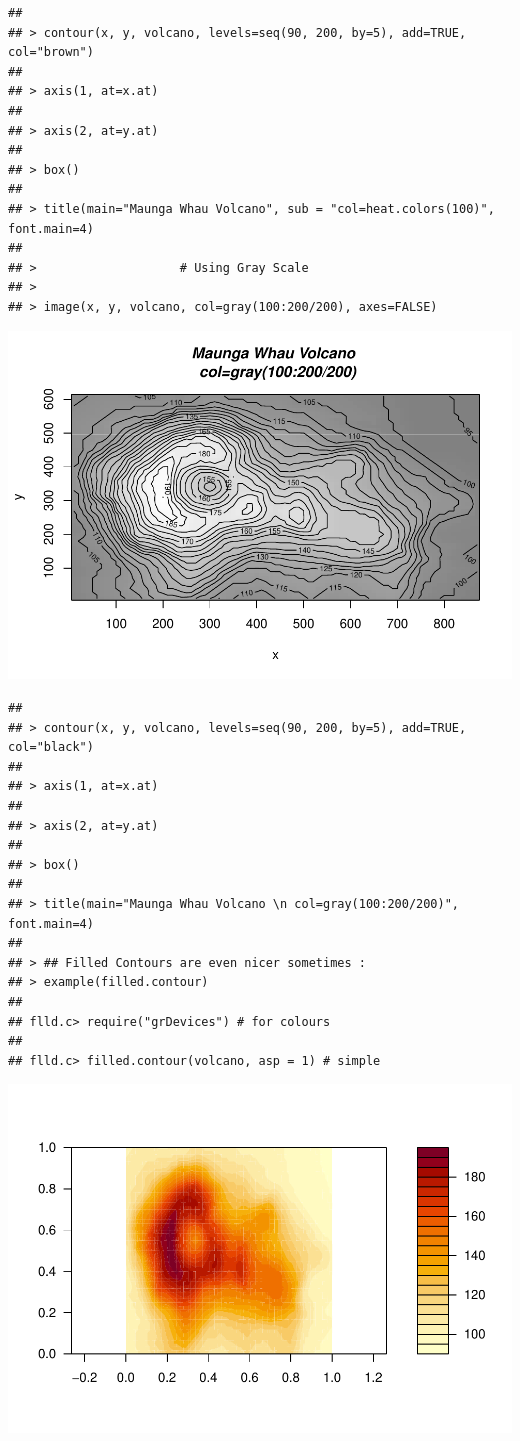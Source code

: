 \documentclass[
]{book}
\begin{document}
\begin{verbatim}
## 
## > contour(x, y, volcano, levels=seq(90, 200, by=5), add=TRUE, col="brown")
## 
## > axis(1, at=x.at)
## 
## > axis(2, at=y.at)
## 
## > box()
## 
## > title(main="Maunga Whau Volcano", sub = "col=heat.colors(100)", font.main=4)
## 
## >                    # Using Gray Scale
## > 
## > image(x, y, volcano, col=gray(100:200/200), axes=FALSE)
\end{verbatim}

\includegraphics{TudodoR_files/figure-latex/unnamed-chunk-145-3.pdf}

\begin{verbatim}
## 
## > contour(x, y, volcano, levels=seq(90, 200, by=5), add=TRUE, col="black")
## 
## > axis(1, at=x.at)
## 
## > axis(2, at=y.at)
## 
## > box()
## 
## > title(main="Maunga Whau Volcano \n col=gray(100:200/200)", font.main=4)
## 
## > ## Filled Contours are even nicer sometimes :
## > example(filled.contour)
## 
## flld.c> require("grDevices") # for colours
## 
## flld.c> filled.contour(volcano, asp = 1) # simple
\end{verbatim}

\includegraphics{TudodoR_files/figure-latex/unnamed-chunk-145-4.pdf}
\end{document}
